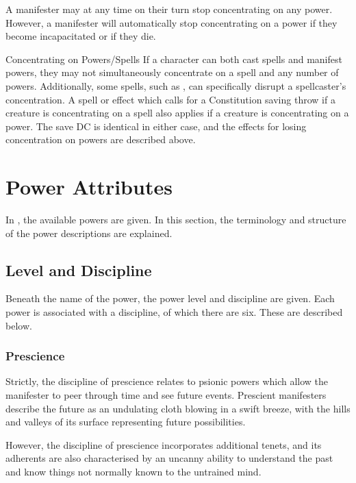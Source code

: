 A manifester may at any time on their turn
stop concentrating on any power.
However, a manifester will automatically stop concentrating on a power
if they become incapacitated or if they die.

\begin{DndSidebar}[float=htbp]{Concentrating on Powers/Spells}
    If a character
    can both cast spells and manifest powers,
    they may not simultaneously concentrate on a spell
    and any number of powers.
    Additionally, some spells, such as ,
    can specifically disrupt a spellcaster's concentration.
    A spell or effect which calls for a Constitution saving throw
    if a creature is concentrating on a spell
    also applies if a creature is concentrating on a power.
    The save DC is identical in either case,
    and the effects for losing concentration on powers
    are described above.
\end{DndSidebar}

\section{Power Attributes}
\label{sec:power_attributes}
In ,
the available powers are given.
In this section,
the terminology and structure of the power descriptions are explained.

\subsection{Level and Discipline}
Beneath the name of the power,
the power level and discipline are given.
Each power is associated with a discipline,
of which there are six.
These are described below.

\subsubsection{Prescience}
Strictly, the discipline of prescience relates to psionic powers
which allow the manifester to peer through time and see future events.
Prescient manifesters describe the future as
an undulating cloth blowing in a swift breeze,
with the hills and valleys of its surface representing
future possibilities. 

However,
the discipline of prescience incorporates additional tenets,
and its adherents are also characterised by an uncanny ability to
understand the past and know things not normally known to
the untrained mind.

